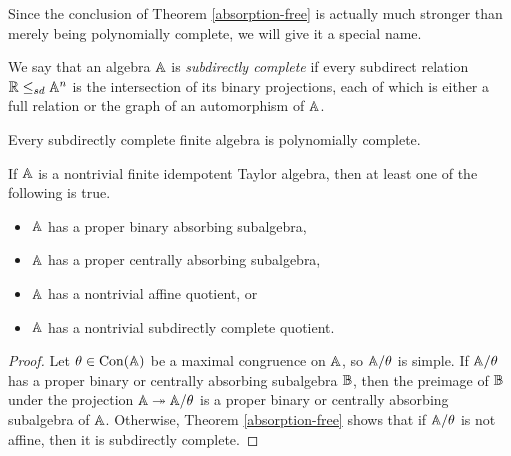 \documentclass[letterpaper,11pt]{article}
\DeclareMathOperator{\Con}{Con}
\begin{document}
Since the conclusion of Theorem \ref{absorption-free} is actually much stronger than merely being polynomially complete, we will give it a special name.

\begin{defn}\label{defn-subdirectly-complete} We say that an algebra $\mathbb{A}$ is \emph{subdirectly complete} if every subdirect relation $\mathbb{R} \le_{sd} \mathbb{A}^n$ is the intersection of its binary projections, each of which is either a full relation or the graph of an automorphism of $\mathbb{A}$.
\end{defn}

\begin{prop} Every subdirectly complete finite algebra is polynomially complete.
\end{prop}

\begin{cor}\label{zhuk-four-cases} If $\mathbb{A}$ is a nontrivial finite idempotent Taylor algebra, then at least one of the following is true.
\begin{itemize}
\item $\mathbb{A}$ has a proper binary absorbing subalgebra,
\item $\mathbb{A}$ has a proper centrally absorbing subalgebra,
\item $\mathbb{A}$ has a nontrivial affine quotient, or
\item $\mathbb{A}$ has a nontrivial subdirectly complete quotient.
\end{itemize}
\end{cor}
\begin{proof} Let $\theta \in \Con(\bA)$ be a maximal congruence on $\mathbb{A}$, so $\mathbb{A}/\theta$ is simple. If $\mathbb{A}/\theta$ has a proper binary or centrally absorbing subalgebra $\mathbb{B}$, then the preimage of $\mathbb{B}$ under the projection $\mathbb{A} \twoheadrightarrow \mathbb{A}/\theta$ is a proper binary or centrally absorbing subalgebra of $\mathbb{A}$. Otherwise, Theorem \ref{absorption-free} shows that if $\mathbb{A}/\theta$ is not affine, then it is subdirectly complete.
\end{proof}
\end{document}
